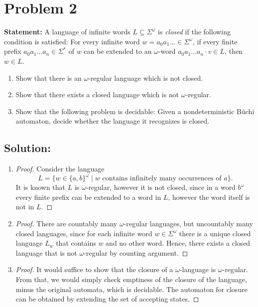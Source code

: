 \documentclass[12pt]{article}
\begin{document}
\newpage

\section*{Problem 2}
\textbf{Statement:} A language of infinite words \(L \subseteq \Sigma^\omega\) is \textit{closed} if the following condition is satisfied: For every infinite word \(w = a_0a_1\ldots \in \Sigma^\omega\), if every finite prefix \(a_0a_1\ldots a_n \in \Sigma^*\) of \(w\) can be extended to an \(\omega\)-word \(a_0a_1\ldots a_n \cdot v \in L\), then \(w \in L\).

\begin{enumerate}[label=\textbf{\arabic*.}]
    \item Show that there is an \(\omega\)-regular language which is not closed.
    \item Show that there exists a closed language which is not \(\omega\)-regular.
    \item Show that the following problem is decidable: Given a nondeterministic Büchi automaton, decide whether the language it recognizes is closed.
\end{enumerate}

\subsection*{Solution:}
\begin{enumerate}[label=\textbf{\arabic*.}]
    \item 
    \begin{proof}
    Consider the language
    \[
    L = \{ w\in\{a,b\}^\omega \mid w \text{ contains infinitely many occurrences of } a\}.
    \]
    It is known that $L$ is $\omega$-regular, however it is not closed, since in a word $b^\omega$ every finite prefix can be extended to a word in $L$, however the word itself is not in $L$.
    \end{proof}
    
    \item 
    \begin{proof}
      There are countably many $\omega$-regular languages, but uncountably many closed languages, since for each infinite word $w\in\Sigma^\omega$ there is a unique closed language $L_w$ that contains $w$ and no other word. Hence, there exists a closed language that is not $\omega$-regular by counting argument.
          
          
    \end{proof}
    
    \item 
    \begin{proof}
      It would suffice to show that the closure of a $\omega$-language is $\omega$-regular. From that, we would simply check emptiness of the closure of the language, minus the original automata, which is decidable.
  The automaton for closure can be obtained by extending the set of accepting states.
    \end{proof}
\end{enumerate}
\end{document}
